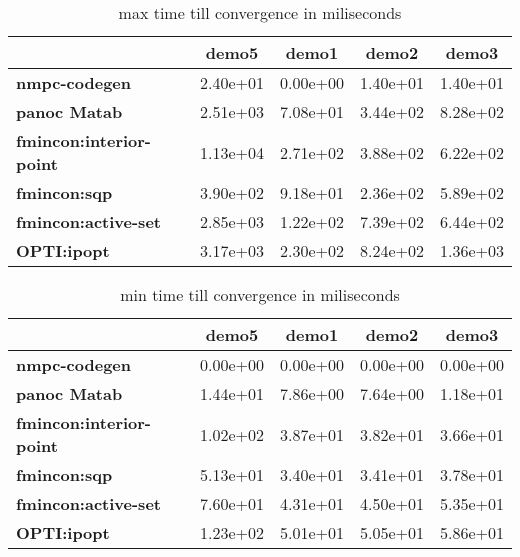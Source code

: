 \begin{center}
	\begin{table}[H]
		\begin{tabular}{|l|c|c|c|c|}
			\hline
			&\textbf{demo5}&\textbf{demo1}&\textbf{demo2}&\textbf{demo3}\\\hline
			\textbf{nmpc-codegen}&2.40e+01&0.00e+00&1.40e+01&1.40e+01\\\hline
			\textbf{panoc Matab}&2.51e+03&7.08e+01&3.44e+02&8.28e+02\\\hline
			\textbf{fmincon:interior-point}&1.13e+04&2.71e+02&3.88e+02&6.22e+02\\\hline
			\textbf{fmincon:sqp}&3.90e+02&9.18e+01&2.36e+02&5.89e+02\\\hline
			\textbf{fmincon:active-set}&2.85e+03&1.22e+02&7.39e+02&6.44e+02\\\hline
			\textbf{OPTI:ipopt}&3.17e+03&2.30e+02&8.24e+02&1.36e+03\\\hline
		\end{tabular}
		\caption{max time till convergence in miliseconds}
		\label{tbl:max time till convergence}
	\end{table}
\end{center}

\begin{center}
	\begin{table}[H]
		\begin{tabular}{|l|	c|c|c|c|}
			\hline
			&\textbf{demo5}&\textbf{demo1}&\textbf{demo2}&\textbf{demo3}\\\hline
			\textbf{nmpc-codegen}&0.00e+00&0.00e+00&0.00e+00&0.00e+00\\\hline
			\textbf{panoc Matab}&1.44e+01&7.86e+00&7.64e+00&1.18e+01\\\hline
			\textbf{fmincon:interior-point}&1.02e+02&3.87e+01&3.82e+01&3.66e+01\\\hline
			\textbf{fmincon:sqp}&5.13e+01&3.40e+01&3.41e+01&3.78e+01\\\hline
			\textbf{fmincon:active-set}&7.60e+01&4.31e+01&4.50e+01&5.35e+01\\\hline
			\textbf{OPTI:ipopt}&1.23e+02&5.01e+01&5.05e+01&5.86e+01\\\hline
		\end{tabular}
		\caption{min time till convergence in miliseconds}
		\label{tbl:min time till convergence}
	\end{table}
\end{center}